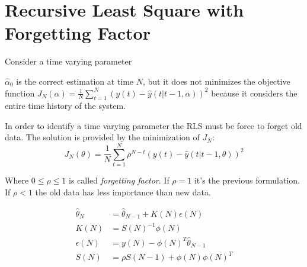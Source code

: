 \section{Recursive Least Square with Forgetting Factor}

Consider a time varying parameter
\begin{figure}[H]
    \centering
    \begin{minipage}[t]{0.48\textwidth}
        \centering
    \end{minipage}
    \begin{minipage}[t]{0.48\textwidth}
        \centering
    \end{minipage}
\end{figure}

$\hat{\alpha}_0$ is the correct estimation at time $N$, but it does not minimizes the objective function $J_N(\alpha)= \frac{1}{N} \sum_{t=1}^N \left( y(t) - \hat{y}(t|t-1, \alpha) \right)^2$ because it considers the entire time history of the system.

In order to identify a time varying parameter the RLS must be force to forget old data.
The solution is provided by the minimization of $J_N$:
\[
    J_N(\theta) = \frac{1}{N} \sum_{t=1}^N \rho^{N-t}\left( y(t) - \hat{y}(t|t-1,\theta) \right)^2
\]

Where $0 \le \rho \le 1$ is called \emph{forgetting factor}. If $\rho=1$ it's the previous formulation. If $\rho<1$ the old data has less importance than new data.

\begin{align*}
    \hat{\theta}_N &= \hat{\theta}_{N-1} + K(N)\epsilon(N) \\
    K(N) &= S(N)^{-1}\phi(N) \\
    \epsilon(N) &= y(N) - \phi(N)^T\hat{\theta}_{N-1} \\
    S(N) &= \rho S(N-1) + \phi(N)\phi(N)^T
\end{align*}

